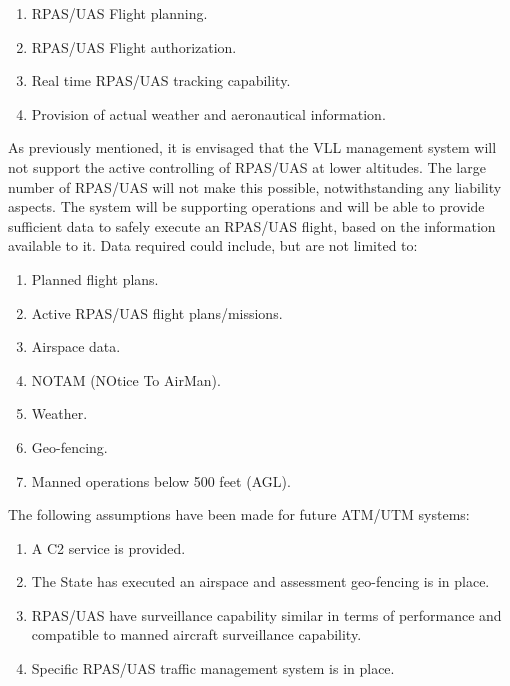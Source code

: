 \begin{enumerate}
    \item  RPAS/UAS Flight planning.
    
    \item  RPAS/UAS Flight authorization.
    
    \item  Real time RPAS/UAS tracking capability.
    
    \item  Provision of actual weather and aeronautical information.
\end{enumerate}

\noindent As previously mentioned, it is envisaged that the VLL management system will not support the active controlling of RPAS/UAS at lower altitudes. The large number of RPAS/UAS will not make this possible, notwithstanding any liability aspects. The system will be supporting operations and will be able to provide sufficient data to safely execute an RPAS/UAS flight, based on the information available to it. Data required could include, but are not limited to:

\begin{enumerate}
    \item Planned flight plans.

    \item Active RPAS/UAS flight plans/missions.

    \item Airspace data.

    \item NOTAM (NOtice To AirMan).
    
    \item Weather.


    \item Geo-fencing.

    \item Manned operations below 500 feet (AGL).
\end{enumerate}



\noindent The following assumptions have been made for future ATM/UTM systems:
\begin{enumerate}
    \item A C2 service is provided.

    \item The State has executed an airspace and assessment geo-fencing is in place.
    
    \item  RPAS/UAS have surveillance capability similar in terms of performance and compatible to manned aircraft surveillance capability.
    
    \item  Specific RPAS/UAS traffic management system is in place.
\end{enumerate}


